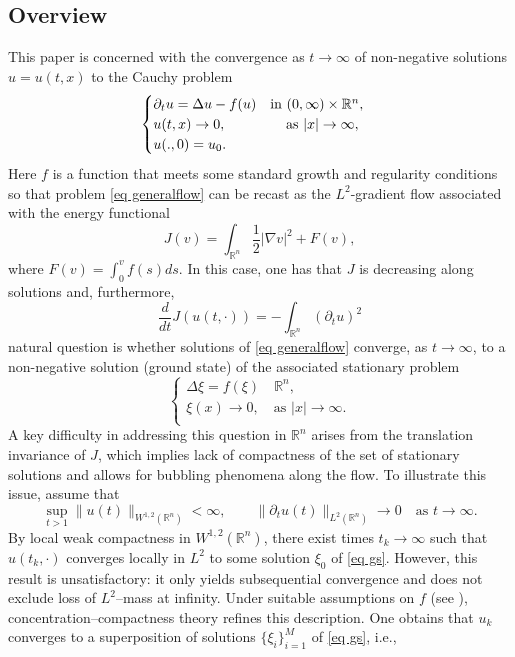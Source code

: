 \documentclass[11pt,letterpaper,reqno]{amsart}
\newcommand{\R}{\mathbb{R}}
\theoremstyle{plain}%
\theoremstyle{definition}
\numberwithin{equation}{section}
\numberwithin{figure}{section}
\begin{document}
\subsection{Overview} This paper is concerned with the convergence as $t \to \infty$ of non-negative solutions $u = u(t,x)$ to the Cauchy problem
\begin{equation}\label{eq generalflow}
\begin{cases}
\partial_t u=   \Delta u - f(u) \quad \text{in} \,\, (0,\infty)\times \R^n, \\
 u(t,x) \to 0, \hspace{1.5cm}  \text{as $|x| \to \infty$},\\
u(.,0)=u_0.
\end{cases}
\end{equation}
Here $f$ is a function that meets some standard growth and regularity conditions so that problem \eqref{eq generalflow} can be recast as the $L^2$-gradient flow associated with the energy functional
\begin{equation}\label{eq energy}
    J(v) = \int_{\R^n} \frac{1}{2} |\nabla v|^2 + F(v),
\end{equation}
where $F(v) = \int_0^v f(s)ds$. In this case, one has that $J$ is decreasing along solutions and, furthermore, 
\begin{equation}\label{eq derentropy}
    \frac{d}{dt} J(u(t,\cdot)) = - \int_{\R^n} (\partial_t u)^2
\end{equation}
 natural question is whether solutions of \eqref{eq generalflow} converge, as $t \to \infty$, to a non-negative solution (ground state) of the associated stationary problem
\begin{equation}\label{eq gs}
\begin{cases}
\Delta \xi = f(\xi) \quad  \R^n, \\
 \xi(x) \to 0, \quad  \text{as $|x| \to \infty$}.\\
\end{cases}
\end{equation}
A key difficulty in addressing this question in $\R^n$ arises from the translation invariance of $J$, which implies lack of compactness of the set of stationary solutions and allows for bubbling phenomena along the flow. To illustrate this issue, assume that
\[
\sup_{t>1}\|u(t)\|_{W^{1,2}(\R^n)} < \infty,
\qquad
\|\partial_t u(t)\|_{L^2(\R^n)} \to 0
\quad \text{as } t\to\infty.
\]
By local weak compactness in $W^{1,2}(\R^n)$, there exist times $t_k \to \infty$ such that $u(t_k,\cdot)$ converges locally in $L^2$ to some solution $\xi_0$ of \eqref{eq gs}. However, this result is unsatisfactory: it only yields subsequential convergence and does not exclude loss of $L^2$--mass at infinity. Under suitable assumptions on $f$ (see \cite{lions1988positive, feireisl1997long, feireisl1997threshold}), concentration--compactness theory refines this description. One obtains that $u_k$ converges to a superposition of solutions $\{\xi_i\}_{i=1}^M$ of \eqref{eq gs}, i.e.,
\end{document}
